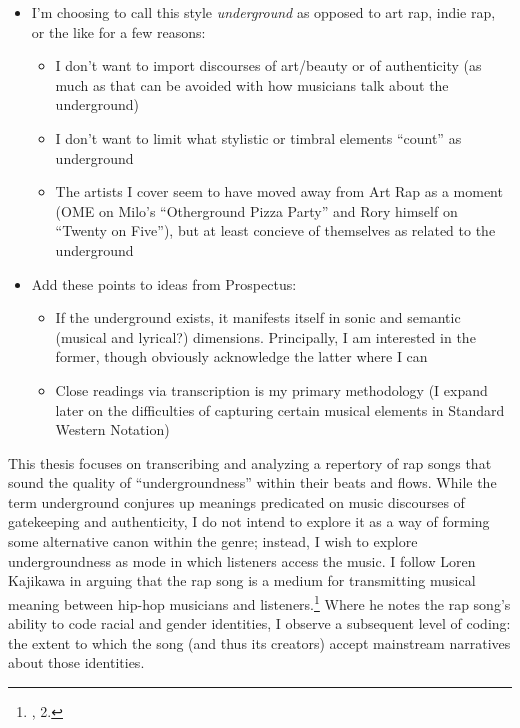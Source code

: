 \begin{itemize}
    \item I'm choosing to call this style \emph{underground} as opposed to art rap, indie rap, or the like for a few reasons:
        \begin{itemize}
            \item I don't want to import discourses of art/beauty or of authenticity (as much as that can be avoided with how musicians talk about the underground)
            \item I don't want to limit what stylistic or timbral elements ``count'' as underground
            \item The artists I cover seem to have moved away from Art Rap as a moment (OME on Milo's ``Otherground Pizza Party'' and Rory himself on ``Twenty on Five''), but at least concieve of themselves as related to the underground 
        \end{itemize}
    \item Add these points to ideas from Prospectus:
        \begin{itemize}
            \item If the underground exists, it manifests itself in sonic and semantic (musical and lyrical?) dimensions. Principally, I am interested in the former, though obviously acknowledge the latter where I can
            \item Close readings via transcription is my primary methodology (I expand later on the difficulties of capturing certain musical elements in Standard Western Notation)
        \end{itemize}
\end{itemize}

This thesis focuses on transcribing and analyzing a repertory of rap songs that sound the quality of ``undergroundness'' within their beats and flows. While the term underground conjures up meanings predicated on music discourses of gatekeeping and authenticity, I do not intend to explore it as a way of forming some alternative canon within the genre; instead, I wish to explore undergroundness as mode in which listeners access the music. I follow Loren Kajikawa in arguing that the rap song is a medium for transmitting musical meaning between hip-hop musicians and listeners.\footnote{\cite{lorenkajikawaSoundingRaceRap2015}, 2.} Where he notes the rap song's ability to code racial and gender identities, I observe a subsequent level of coding: the extent to which the song (and thus its creators) accept mainstream narratives about those identities.


